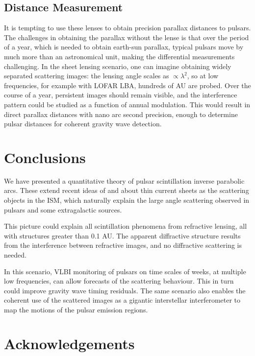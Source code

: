 \documentclass[useAMS,usenatbib]{mn2e}
\begin{document}
\subsection{Distance Measurement}

It is tempting to use these lenses to obtain precision parallax
distances to pulsars.  The challenges in obtaining the parallax without the lense
 is that over the
period of a year, which is needed to obtain earth-sun parallax,
typical pulsars move by much more than an astronomical unit, making
the differential measurements challenging.  In the sheet lensing
scenario, one can imagine obtaining widely separated scattering images:
the lensing angle scales as $\propto \lambda^2$, so at low
frequencies, for example with LOFAR LBA, hundreds of AU are probed.
Over the course of a year, persistent images should remain visible, and the
interference pattern could be studied as a function of annual
modulation.  This would result in direct parallax distances with nano arc
second precision, enough to determine pulsar distances for coherent
gravity wave detection.

\section{Conclusions}

We have presented a quantitative theory of pulsar scintillation
inverse parabolic arcs.  These extend recent ideas of
\citet{2006ApJ...640L.159G} and \citet{2012MNRAS.421L.132P} about thin
current sheets as the scattering objects in the ISM, which naturally
explain the large angle scattering observed in pulsars and some
extragalactic sources.

This picture could explain all scintillation phenomena from refractive
lensing, all with structures greater than 0.1 AU.  The apparent
diffractive structure results from the interference between refractive
images, and no diffractive scattering is needed.

In this scenario, VLBI monitoring of pulsars on time scales of weeks,
at multiple low frequencies, can allow forecasts of the scattering
behaviour.  This in turn could improve gravity wave timing residuals.
The same scenario also enables the coherent use of the scattered
images as a gigantic interstellar interferometer to map the motions of
the pulsar emission regions.

\section{Acknowledgements}
\end{document}

